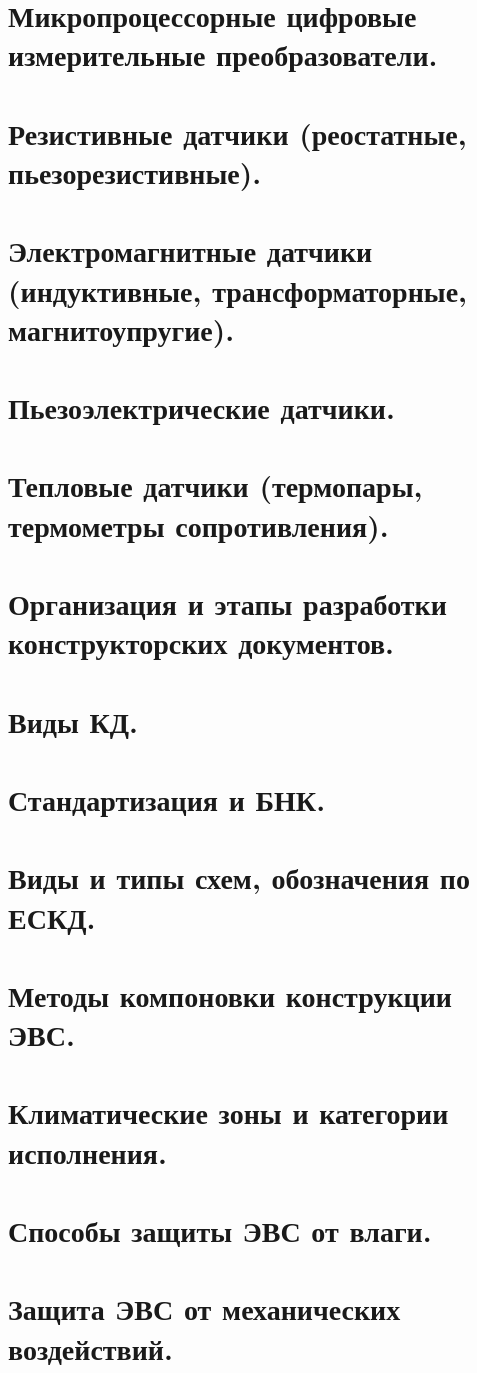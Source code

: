\documentclass[unicode, 12pt, a4paper, oneside]{article}
\begin{document}
\section{Микропроцессорные цифровые измерительные преобразователи.}
\section{Резистивные датчики (реостатные, пьезорезистивные).}
\section{Электромагнитные датчики (индуктивные, трансформаторные, магнитоупругие).}
\section{Пьезоэлектрические датчики.}
\section{Тепловые датчики (термопары, термометры сопротивления).}
\section{Организация и этапы разработки конструкторских документов.}
\section{Виды КД.}
\section{Стандартизация и БНК.}
\section{Виды и типы схем, обозначения по ЕСКД.}
\section{Методы компоновки конструкции ЭВС.}
\section{Климатические зоны и категории исполнения.}
\section{Способы защиты ЭВС от влаги.}
\section{Защита ЭВС от механических воздействий.}
\end{document}
